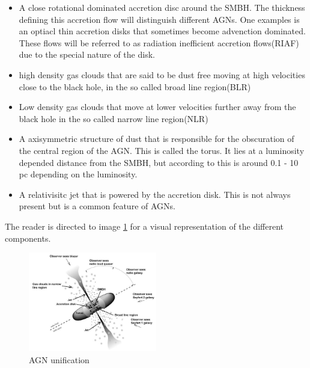 \documentclass{article}
\begin{document}
\begin{itemize}
    \item A close rotational dominated accretion disc around the SMBH. The thickness defining this accretion flow will distinguish different AGNs. 
    One examples is an optiacl thin accretion disks that sometimes become advenction dominated.
    These flows will be referred to as radiation inefficient accretion flows(RIAF) due to the special nature of the disk.
    \item high density gas clouds that are said to be dust free moving at high velocities close to the black hole, in the so called broad line region(BLR)
    \item Low density gas clouds that move at lower velocities further away from the black hole in the so called narrow line region(NLR)
    \item A axisymmetric structure of dust that is responsible for the obscuration of the central region of the AGN. This is called the torus.
     It lies at a luminosity depended distance from the SMBH, but according to \cite{Netzer_2015} this is around 0.1 - 10 pc depending on the luminosity.
    \item A relativisitc jet that is powered by the accretion disk. This is not always present but is a common feature of AGNs.


\end{itemize}
The reader is directed to image \ref{fig:my_label} for a visual representation of the different components.


\begin{figure}
    \centering
    \includegraphics[width = 0.5\textwidth]{unified model agn.jpg}
    \caption{AGN unification}
    \label{fig:my_label}
\end{figure}
\end{document}
